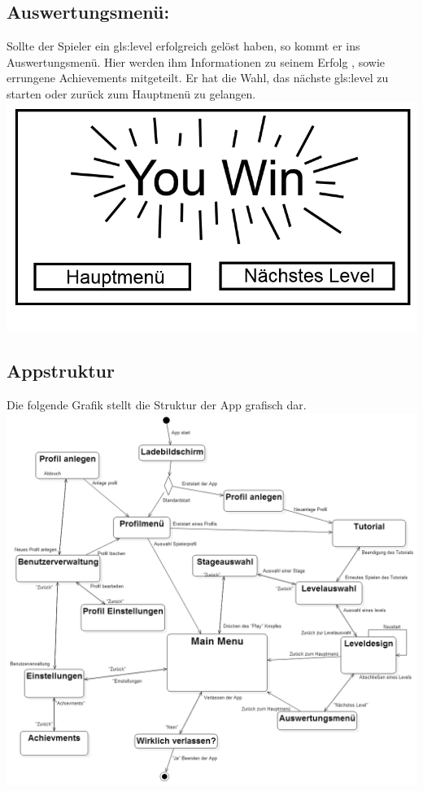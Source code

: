 \documentclass{scrartcl}
\begin{document}
\begin{enumerate}
	\begin{minipage}{1\textwidth}
		\item \subsection*{Auswertungsmenü:}
		Sollte der Spieler ein \gls{gls:level} erfolgreich gelöst haben, so kommt er ins Auswertungsmenü. Hier werden ihm Informationen zu seinem Erfolg , sowie errungene Achievements mitgeteilt. Er hat die Wahl, das nächste \gls{gls:level} zu starten oder zurück zum Hauptmenü zu gelangen. 
		\includegraphics[scale=0.5]{assets/Auswertungsmenu}
	\end{minipage}

\end{enumerate}

\clearpage

\begin{minipage}{1\textwidth}
\subsection{Appstruktur}
	Die folgende Grafik stellt die Struktur der App grafisch dar.\\
	\includegraphics[width=\textwidth]{assets/Menustructur}
\end{minipage}
\end{document}
